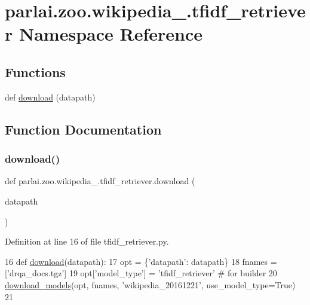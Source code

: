 \hypertarget{namespaceparlai_1_1zoo_1_1wikipedia__20161221_1_1tfidf__retriever}{}\section{parlai.\+zoo.\+wikipedia\+\_.\+tfidf\+\_\+retriever Namespace Reference}
\label{namespaceparlai_1_1zoo_1_1wikipedia__20161221_1_1tfidf__retriever}
\subsection*{Functions}
\begin{DoxyCompactItemize}
\item 
def \hyperlink{namespaceparlai_1_1zoo_1_1wikipedia__20161221_1_1tfidf__retriever_ab7244a441485a5fe1c530388a63a5a91}{download} (datapath)
\end{DoxyCompactItemize}


\subsection{Function Documentation}
\mbox{\label{namespaceparlai_1_1zoo_1_1wikipedia__20161221_1_1tfidf__retriever_ab7244a441485a5fe1c530388a63a5a91}} 
\subsubsection{\texorpdfstring{download()}{download()}}
{\footnotesize\ttfamily def parlai.\+zoo.\+wikipedia\+\_.\+tfidf\+\_\+retriever.\+download (\begin{DoxyParamCaption}\item[{}]{datapath }\end{DoxyParamCaption})}



Definition at line 16 of file tfidf\+\_\+retriever.\+py.


\begin{DoxyCode}
16 \textcolor{keyword}{def }\hyperlink{namespaceparlai_1_1zoo_1_1wikipedia__full_1_1tfidf__retriever_ae4ca3b13b024e2db9313c275cfcdfac7}{download}(datapath):
17     opt = \{\textcolor{stringliteral}{'datapath'}: datapath\}
18     fnames = [\textcolor{stringliteral}{'drqa\_docs.tgz'}]
19     opt[\textcolor{stringliteral}{'model\_type'}] = \textcolor{stringliteral}{'tfidf\_retriever'}  \textcolor{comment}{# for builder}
20     \hyperlink{namespaceparlai_1_1core_1_1build__data_ab697f23f05d3e36d7979fe5e0ed7911e}{download\_models}(opt, fnames, \textcolor{stringliteral}{'wikipedia\_20161221'}, use\_model\_type=\textcolor{keyword}{True})
21 \end{DoxyCode}
